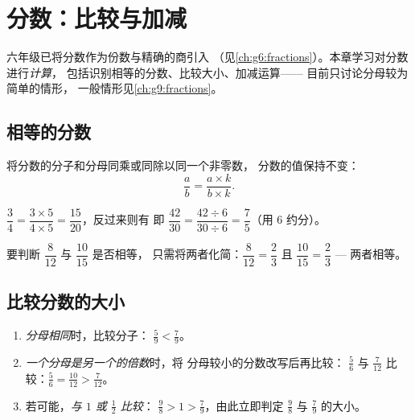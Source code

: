 \chapter{分数：比较与加减}\label{ch:g7:fractions}

六年级已将分数作为份数与精确的商引入
（见\cref{ch:g6:fractions}）。本章学习对分数进行\emph{计算}，
包括识别相等的分数、比较大小、加减运算——
目前只讨论分母较为简单的情形，
一般情形见\cref{ch:g9:fractions}。

\section{相等的分数}

\begin{theorem}[相等的分数]\label{thm:g7:fractions:equal}
将分数的分子和分母同乘或同除以同一个非零数，
分数的值保持不变：
\[
\frac{a}{b} = \frac{a \times k}{b \times k} .
\]
\end{theorem}
\admitted

\begin{example}\label{ex:g7:fractions:equal}
$\dfrac{3}{4} = \dfrac{3 \times 5}{4 \times 5} = \dfrac{15}{20}$，反过来则有
即 $\dfrac{42}{30} = \dfrac{42 \div 6}{30 \div 6}
= \dfrac{7}{5}$（用 $6$ 约分）。

要判断 $\dfrac{8}{12}$ 与 $\dfrac{10}{15}$ 是否相等，
只需将两者化简：$\dfrac{8}{12} = \dfrac{2}{3}$ 且
$\dfrac{10}{15} = \dfrac{2}{3}$ --- 两者相等。
\end{example}

\section{比较分数的大小}

\begin{method}[比较两个分数的大小]\label{met:g7:fractions:compare}
\begin{enumerate}
  \item \emph{分母相同}时，比较分子：
        $\frac{5}{9} < \frac{7}{9}$。
  \item \emph{一个分母是另一个的倍数}时，将
        分母较小的分数改写后再比较：
        $\frac{5}{6}$ 与 $\frac{7}{12}$ 比较：$\frac56 = \frac{10}{12} >
        \frac{7}{12}$。
  \item 若可能，\emph{与 $1$ 或 $\frac12$ 比较}：
        $\frac{9}{8} > 1 > \frac{7}{9}$，由此立即判定
        $\frac98$ 与 $\frac79$ 的大小。
\end{enumerate}
\end{method}

